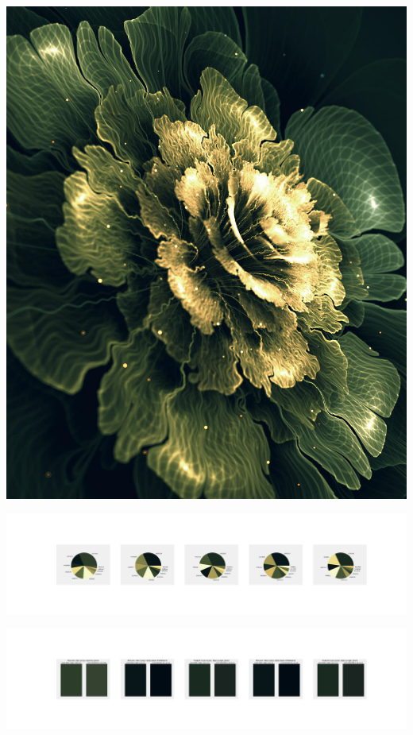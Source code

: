 \documentclass[11pt]{article}
\begin{document}
\begin{landscape}
    \begin{center}
    \includegraphics[width=\textwidth]{./nbimg/file (124).jpg}
    \end{center}

    \begin{center}
    \includegraphics[width=250mm]{./nbimg/pie-28.jpg}
    \end{center}

    \begin{center}
    \includegraphics[width=250mm]{./nbimg/peak-28.jpg}
    \end{center}
    


\end{landscape}
\end{document}
